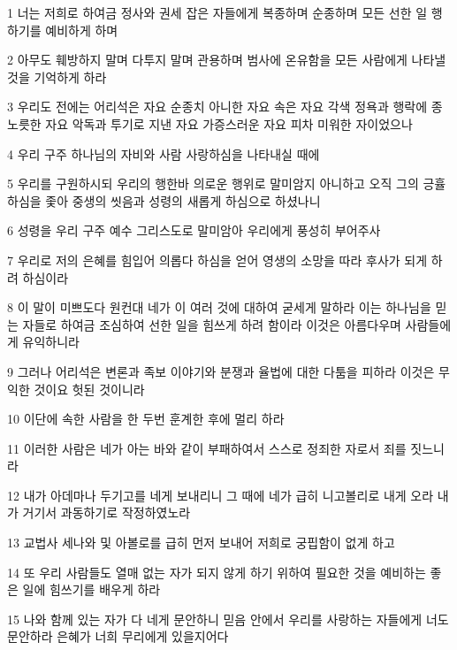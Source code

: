 \par 1 너는 저희로 하여금 정사와 권세 잡은 자들에게 복종하며 순종하며 모든 선한 일 행하기를 예비하게 하며
\par 2 아무도 훼방하지 말며 다투지 말며 관용하며 범사에 온유함을 모든 사람에게 나타낼 것을 기억하게 하라
\par 3 우리도 전에는 어리석은 자요 순종치 아니한 자요 속은 자요 각색 정욕과 행락에 종노릇한 자요 악독과 투기로 지낸 자요 가증스러운 자요 피차 미워한 자이었으나
\par 4 우리 구주 하나님의 자비와 사람 사랑하심을 나타내실 때에
\par 5 우리를 구원하시되 우리의 행한바 의로운 행위로 말미암지 아니하고 오직 그의 긍휼하심을 좇아 중생의 씻음과 성령의 새롭게 하심으로 하셨나니
\par 6 성령을 우리 구주 예수 그리스도로 말미암아 우리에게 풍성히 부어주사
\par 7 우리로 저의 은혜를 힘입어 의롭다 하심을 얻어 영생의 소망을 따라 후사가 되게 하려 하심이라
\par 8 이 말이 미쁘도다 원컨대 네가 이 여러 것에 대하여 굳세게 말하라 이는 하나님을 믿는 자들로 하여금 조심하여 선한 일을 힘쓰게 하려 함이라 이것은 아름다우며 사람들에게 유익하니라
\par 9 그러나 어리석은 변론과 족보 이야기와 분쟁과 율법에 대한 다툼을 피하라 이것은 무익한 것이요 헛된 것이니라
\par 10 이단에 속한 사람을 한 두번 훈계한 후에 멀리 하라
\par 11 이러한 사람은 네가 아는 바와 같이 부패하여서 스스로 정죄한 자로서 죄를 짓느니라
\par 12 내가 아데마나 두기고를 네게 보내리니 그 때에 네가 급히 니고볼리로 내게 오라 내가 거기서 과동하기로 작정하였노라
\par 13 교법사 세나와 및 아볼로를 급히 먼저 보내어 저희로 궁핍함이 없게 하고
\par 14 또 우리 사람들도 열매 없는 자가 되지 않게 하기 위하여 필요한 것을 예비하는 좋은 일에 힘쓰기를 배우게 하라
\par 15 나와 함께 있는 자가 다 네게 문안하니 믿음 안에서 우리를 사랑하는 자들에게 너도 문안하라 은혜가 너희 무리에게 있을지어다


